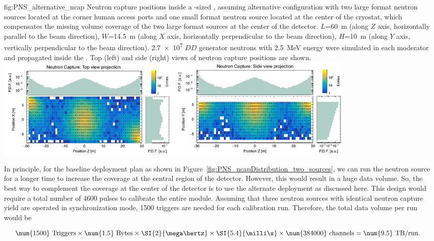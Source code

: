 \begin{dunefigure}{fig:PNS_alternative_ncap}
{Neutron capture positions inside a -sized , assuming alternative configuration with two large format neutron sources located at the corner human access ports and one small format neutron source located at the center of the cryostat, which compensates the missing volume coverage of the two large format sources at the center of the detector.  $L$=\SI{60}{\m} (along $Z$ axis, horizontally parallel to the beam direction), $W$=\SI{14.5}{\m} (along $X$ axis, horizontally perpendicular to the beam direction), $H$=\SI{10}{\m} (along $Y$ axis, vertically perpendicular to the beam direction). \num{2.7e7} $DD$ generator neutrons with \SI{2.5}{\MeV} energy were simulated in each moderator and propagated inside the . Top (left) and side (right) views of neutron capture positions are shown.}
\includegraphics[width=18cm]{graphics/PNS_ncapDistribution_three_sources.png}
\end{dunefigure}

In principle, for the baseline deployment plan as shown in Figure~\ref{fig:PNS_ncapDistribution_two_sources}, we can run the neutron source for a longer time to increase the coverage at the central region of the detector. However, this would result in a huge data volume. So, the best way to complement the coverage at the center of the detector is to use the alternate deployment as discussed here. This design would require a total number of \num{4600} pulses to calibrate the entire \nominalmodsize module. Assuming that three neutron sources with identical neutron capture yield are operated in synchronization mode, \num{1500} triggers are needed for each calibration run. Therefore, the total data volume per run would be 

\begin{equation}
\num{1500}~{\rm Triggers} \times \num{1.5}~{\rm Bytes}\times
\SI{2}{\mega\hertz}\times \SI{5.4}{\milli\s}\times \num{384000}~{\rm channels} = \num{9.5}~{\rm TB/run}.
\end{equation}

